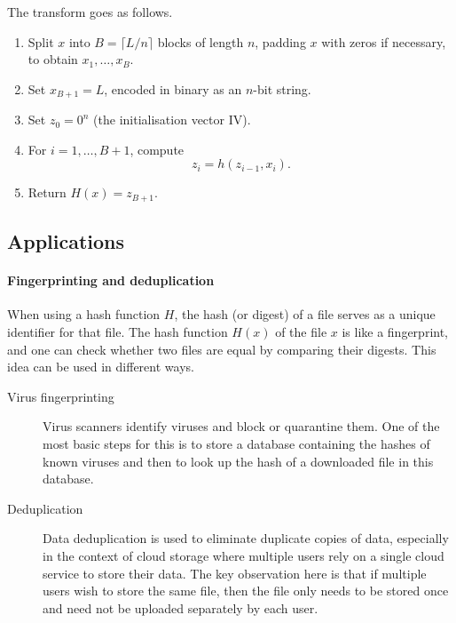 \documentclass[a4paper, 11pt, openany]{book}
\begin{document}
The transform goes as follows.
\begin{enumerate}
    \item Split $x$ into $B = \lceil L/n \rceil$ blocks of length $n$, padding $x$ with zeros if necessary, to obtain $x_1, \dots, x_B$.

    \item Set $x_{B+1} = L$, encoded in binary as an $n$-bit string.

    \item Set $z_0 = 0^n$ (the initialisation vector IV).

    \item For $i=1, \dots, B+1$, compute
    \[
        z_i = h( z_{i-1}, x_i).
    \]

    \item Return $H(x) = z_{B+1}$.
\end{enumerate}



\subsection{Applications}

\paragraph{Fingerprinting and deduplication}
When using a hash function $H$, the hash (or digest) of a file serves as a unique identifier for that file. The hash function $H(x)$ of the file $x$ is like a fingerprint, and one can check whether two files are equal by comparing their digests. This idea can be used in different ways.

\begin{description}
    \item [Virus fingerprinting] Virus scanners identify viruses and block or quarantine them. One of the most basic steps for this is to store a database containing the hashes of known viruses and then to look up the hash of a downloaded file in this database.

    \item [Deduplication] Data deduplication is used to eliminate duplicate copies of data, especially in the context of cloud storage where multiple users rely on a single cloud service to store their data. The key observation here is that if multiple users wish to store the same file, then the file only needs to be stored once and need not be uploaded separately by each user.
\end{description}
\end{document}
